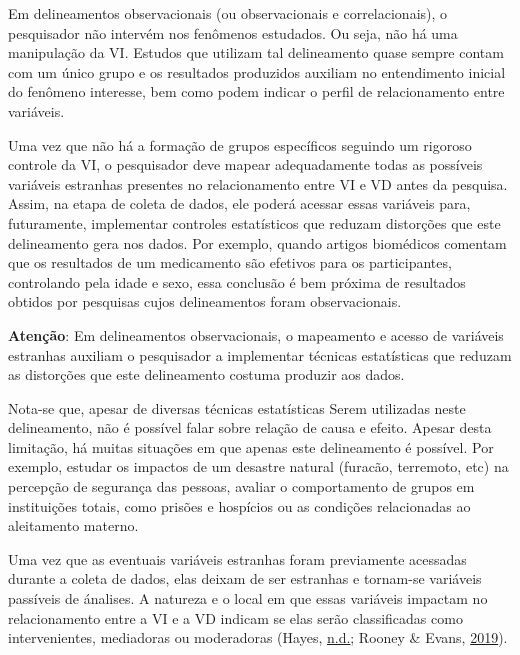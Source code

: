\documentclass[
]{book}
\begin{document}
Em delineamentos observacionais (ou observacionais e correlacionais), o
pesquisador não intervém nos fenômenos estudados. Ou seja, não há uma
manipulação da VI. Estudos que utilizam tal delineamento quase sempre
contam com um único grupo e os resultados produzidos auxiliam no
entendimento inicial do fenômeno interesse, bem como podem indicar o
perfil de relacionamento entre variáveis.

Uma vez que não há a formação de grupos específicos seguindo um rigoroso
controle da VI, o pesquisador deve mapear adequadamente todas as
possíveis variáveis estranhas presentes no relacionamento entre VI e VD
antes da pesquisa. Assim, na etapa de coleta de dados, ele poderá
acessar essas variáveis para, futuramente, implementar controles
estatísticos que reduzam distorções que este delineamento gera nos
dados. Por exemplo, quando artigos biomédicos comentam que os resultados
de um medicamento são efetivos para os participantes, controlando pela
idade e sexo, essa conclusão é bem próxima de resultados obtidos por
pesquisas cujos delineamentos foram observacionais.

\begin{warning}

\textbf{Atenção}: Em delineamentos observacionais, o mapeamento e acesso
de variáveis estranhas auxiliam o pesquisador a implementar técnicas
estatísticas que reduzam as distorções que este delineamento costuma
produzir aos dados.

\end{warning}

Nota-se que, apesar de diversas técnicas estatísticas Serem utilizadas
neste delineamento, não é possível falar sobre relação de causa e
efeito. Apesar desta limitação, há muitas situações em que apenas este
delineamento é possível. Por exemplo, estudar os impactos de um desastre
natural (furacão, terremoto, etc) na percepção de segurança das pessoas,
avaliar o comportamento de grupos em instituições totais, como prisões e
hospícios ou as condições relacionadas ao aleitamento materno.

Uma vez que as eventuais variáveis estranhas foram previamente acessadas
durante a coleta de dados, elas deixam de ser estranhas e tornam-se
variáveis passíveis de ánalises. A natureza e o local em que essas
variáveis impactam no relacionamento entre a VI e a VD indicam se elas
serão classificadas como intervenientes, mediadoras ou moderadoras
(Hayes, \protect\hyperlink{ref-hayes2013}{n.d.}; Rooney \& Evans,
\protect\hyperlink{ref-Rooney2019}{2019}).
\end{document}
